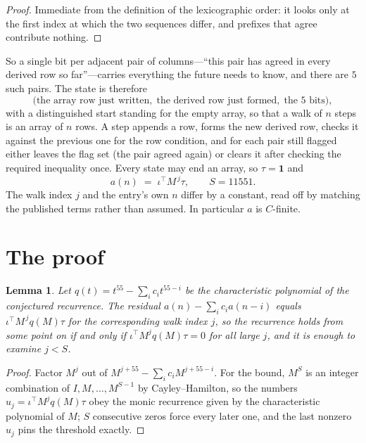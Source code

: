 \documentclass[11pt,a4paper]{article}
\theoremstyle{plain}
\newtheorem{lemma}[theorem]{Lemma}
\theoremstyle{definition}
\begin{document}
\begin{proof}
Immediate from the definition of the lexicographic order: it looks only at the first index at
which the two sequences differ, and prefixes that agree contribute nothing.
\end{proof}

So a single bit per adjacent pair of columns---``this pair has agreed in every derived row so
far''---carries everything the future needs to know, and there are $5$ such pairs. The state
is therefore
\[
\bigl(\text{the array row just written},\; \text{the derived row just formed},\;
\text{the 5 bits}\bigr),
\]
with a distinguished start standing for the empty array, so that a walk of $n$ steps is an array
of $n$ rows. A step appends a row, forms the new derived row, checks it against the previous one
for the row condition, and for each pair still flagged either leaves the flag set (the pair
agreed again) or clears it after checking the required inequality once. Every state may end an
array, so $\tau=\mathbf{1}$ and
\[
a(n)\;=\;\iota^{\!\top}M^{\,j}\tau ,\qquad S=11551.
\]
The walk index $j$ and the entry's own $n$ differ by a constant, read off by matching the
published terms rather than assumed. In particular $a$ is $C$-finite.

\section{The proof}

\begin{lemma}\label{lem:crit}
Let $q(t)=t^{55}-\sum_i c_it^{55-i}$ be the characteristic polynomial of the
conjectured recurrence. The residual $a(n)-\sum_ic_ia(n-i)$ equals
$\iota^{\!\top}M^{\,j}q(M)\tau$ for the corresponding walk index $j$, so the recurrence
holds from some point on if and only if $\iota^{\!\top}M^{j}q(M)\tau=0$ for all large $j$,
and it is enough to examine $j<S$.
\end{lemma}

\begin{proof}
Factor $M^{j}$ out of $M^{j+55}-\sum_ic_iM^{j+55-i}$. For the bound, $M^{S}$
is an integer combination of $I,M,\dots,M^{S-1}$ by Cayley--Hamilton, so the numbers
$u_j=\iota^{\!\top}M^{j}q(M)\tau$ obey the monic recurrence given by the characteristic
polynomial of $M$; $S$ consecutive zeros force every later one, and the last nonzero $u_j$
pins the threshold exactly.
\end{proof}
\end{document}
